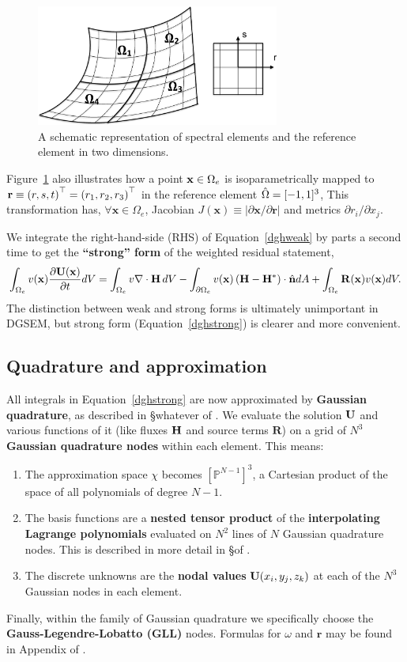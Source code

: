 \begin{figure}
\centering
\includegraphics[width=8.0cm]{elements}
\caption{A schematic representation of spectral elements and the reference element in two dimensions.}
\label{elements}
\end{figure}

Figure~\ref{elements} also illustrates how a point ${\bf x}\in\Omega_e$ is isoparametrically mapped to
$\mathbf{r}\equiv\left(r,s,t\right)^{\top}=\left(r_1,r_2,r_3\right)^{\top}$ in the reference element
${\hat \Omega}=[-1,1]^3$,
This transformation has, $\forall \mathbf{x}\in\Omega_e$,
Jacobian $J(\mathbf{x})\equiv|\partial \mathbf{x}/\partial \mathbf{r}|$ and
metrics $\partial r_i/\partial x_j$.

We integrate the right-hand-side (RHS) of Equation~\ref{dghweak} by parts a second time to get
the \textbf{``strong'' form} of the weighted residual statement,
\begin{equation}
\int_{\Omega_e} v({\bf x}) \frac{\partial {\bf U}({\bf x})}{\partial t}dV = 
\int_{\Omega_e} v \nabla \cdot {\bf H}\, dV  
-\int_{\partial \Omega_e} v({\bf x}) \left({\bf H}-{\bf H}^{\ast}\right) \cdot {\hat {\bf n}} dA +
\int_{\Omega_e} \mathbf{R}({\bf x}) v({\bf x}) dV.
\label{dghstrong}
\end{equation}
The distinction between weak and strong forms is ultimately unimportant in DGSEM,
but strong form (Equation~\ref{dghstrong}) is clearer and more convenient.

\subsection{Quadrature and approximation}
All integrals in Equation~\ref{dghstrong} are now approximated by
\textbf{Gaussian quadrature}, as described in \S whatever of \cite{dfm02}.
We evaluate the solution ${\bf U}$ and various functions of it (like fluxes ${\bf H}$ and
source terms $\mathbf{R}$) on a grid of $N^3$ \textbf{Gaussian quadrature nodes}
within each element. This means:
\begin{enumerate}
\item The approximation space $\chi$ becomes $[\mathbb{P}^{N-1}]^3$, a Cartesian product of the space of all
polynomials of degree $N-1$.
\item The basis functions are a \textbf{nested tensor product} of the \textbf{interpolating Lagrange
polynomials} evaluated on $N^2$ lines of $N$ Gaussian quadrature nodes. This is
described in more detail in \S of \cite{dfm02}.
\item The discrete unknowns are the \textbf{nodal values} ${\bf U}(x_i,y_j,z_k)$ at each of the $N^3$ Gaussian nodes in each element.
\end{enumerate}
Finally, within the family of Gaussian quadrature we specifically choose the
\textbf{Gauss-Legendre-Lobatto (GLL)} nodes. Formulas for $\omega$ and $\mathbf{r}$ may be found in Appendix of \cite{dfm02}.

